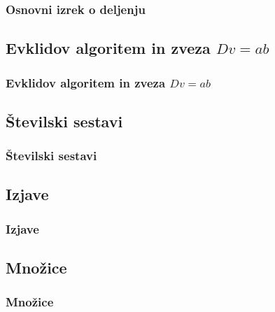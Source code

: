         \begin{frame}
            \frametitle{Osnovni izrek o deljenju}
        \end{frame}

    \subsection{Evklidov algoritem in zveza $D v=ab$}

        \begin{frame}
            \frametitle{Evklidov algoritem in zveza $Dv=ab$}
        \end{frame}

    \subsection{Številski sestavi}

        \begin{frame}
            \frametitle{Številski sestavi}
        \end{frame}

    \subsection{Izjave}

        \begin{frame}
            \frametitle{Izjave}
        \end{frame}
        
    \subsection{Množice}

        \begin{frame}
            \frametitle{Množice}
        \end{frame}